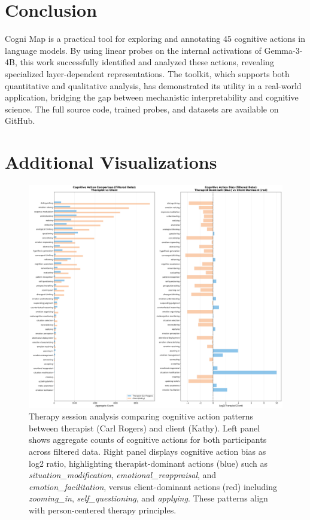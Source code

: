 \documentclass[letterpaper]{article}
\begin{document}
\section{Conclusion}

Cogni Map is a practical tool for exploring and annotating 45 cognitive actions in language models. By using linear probes on the internal activations of Gemma-3-4B, this work successfully identified and analyzed these actions, revealing specialized layer-dependent representations. The toolkit, which supports both quantitative and qualitative analysis, has demonstrated its utility in a real-world application, bridging the gap between mechanistic interpretability and cognitive science. The full source code, trained probes, and datasets are available on GitHub.



\clearpage
\appendix

\section{Additional Visualizations}

\begin{figure}[t]
\centering
\includegraphics[width=\textwidth]{../Keep_viz/rogers_kathy_comparison.png}
\caption{Therapy session analysis comparing cognitive action patterns between therapist (Carl Rogers) and client (Kathy). Left panel shows aggregate counts of cognitive actions for both participants across filtered data. Right panel displays cognitive action bias as log2 ratio, highlighting therapist-dominant actions (blue) such as \textit{situation\_modification}, \textit{emotional\_reappraisal}, and \textit{emotion\_facilitation}, versus client-dominant actions (red) including \textit{zooming\_in}, \textit{self\_questioning}, and \textit{applying}. These patterns align with person-centered therapy principles.}
\label{fig:therapy_comparison}
\end{figure}
\end{document}
